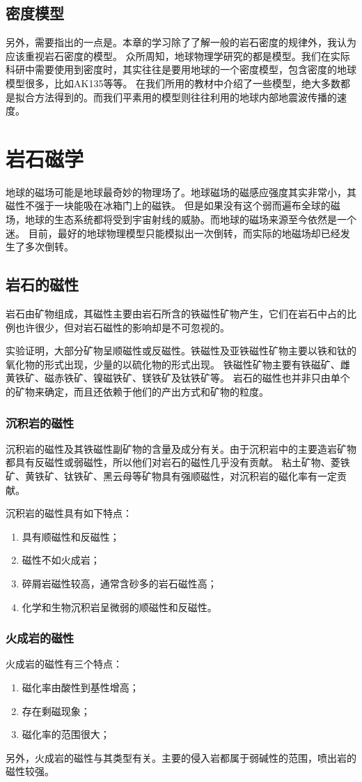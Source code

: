 \documentclass[hyperref,UTF-8,twoside]{ctexart}
\begin{document}
\subsection{密度模型}
另外，需要指出的一点是。本章的学习除了了解一般的岩石密度的规律外，我认为应该重视岩石密度的模型。
众所周知，地球物理学研究的都是模型。我们在实际科研中需要使用到密度时，其实往往是要用地球的一个密度模型，包含密度的地球模型很多，比如AK135等等。
在我们所用的教材中介绍了一些模型，绝大多数都是拟合方法得到的。而我们平素用的模型则往往利用的地球内部地震波传播的速度。
\section{岩石磁学}
地球的磁场可能是地球最奇妙的物理场了。地球磁场的磁感应强度其实非常小，其磁性不强于一块能吸在冰箱门上的磁铁。
但是如果没有这个弱而遍布全球的磁场，地球的生态系统都将受到宇宙射线的威胁。而地球的磁场来源至今依然是一个迷。
目前，最好的地球物理模型只能模拟出一次倒转，而实际的地磁场却已经发生了多次倒转。
\subsection{岩石的磁性}
岩石由矿物组成，其磁性主要由岩石所含的铁磁性矿物产生，它们在岩石中占的比例也许很少，但对岩石磁性的影响却是不可忽视的。

实验证明，大部分矿物呈顺磁性或反磁性。铁磁性及亚铁磁性矿物主要以铁和钛的氧化物的形式出现，少量的以硫化物的形式出现。
铁磁性矿物主要有铁磁矿、雌黄铁矿、磁赤铁矿、镍磁铁矿、镁铁矿及钛铁矿等。
岩石的磁性也并非只由单个的矿物来确定，而且还依赖于他们的产出方式和矿物的粒度。
\subsubsection{沉积岩的磁性}
沉积岩的磁性及其铁磁性副矿物的含量及成分有关。由于沉积岩中的主要造岩矿物都具有反磁性或弱磁性，所以他们对岩石的磁性几乎没有贡献。
粘土矿物、菱铁矿、黄铁矿、钛铁矿、黑云母等矿物具有强顺磁性，对沉积岩的磁化率有一定贡献。

沉积岩的磁性具有如下特点：
\begin{enumerate}
\item 具有顺磁性和反磁性；
\item 磁性不如火成岩；
\item 碎屑岩磁性较高，通常含砂多的岩石磁性高；
\item 化学和生物沉积岩呈微弱的顺磁性和反磁性。
\end{enumerate}
\subsubsection{火成岩的磁性}
火成岩的磁性有三个特点：
\begin{enumerate}
\item 磁化率由酸性到基性增高；
\item 存在剩磁现象；
\item 磁化率的范围很大；
\end{enumerate}
另外，火成岩的磁性与其类型有关。主要的侵入岩都属于弱碱性的范围，喷出岩的磁性较强。
\end{document}
